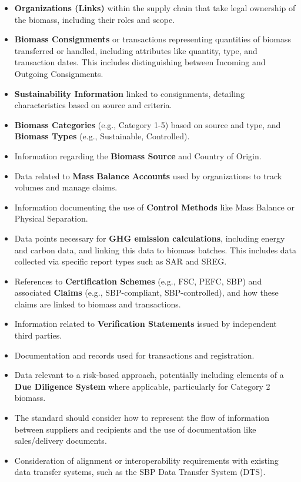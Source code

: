 \documentclass[title=small,preset=opensansnote,par=skip]{article}
\begin{document}
\begin{itemize}
\item \textbf{Organizations (Links)} within the supply chain that take legal ownership of the biomass, including their roles and scope.
\item \textbf{Biomass Consignments} or transactions representing quantities of   biomass transferred or handled, including attributes like quantity,   type, and transaction dates. This includes distinguishing between Incoming and Outgoing Consignments.
\item \textbf{Sustainability Information} linked to consignments, detailing   characteristics based on source and criteria.
\item \textbf{Biomass Categories} (e.g., Category 1-5) based on source and type,   and \textbf{Biomass Types} (e.g., Sustainable, Controlled).
\item Information regarding the \textbf{Biomass Source} and Country of Origin.
\item Data related to \textbf{Mass Balance Accounts} used by organizations to track volumes and manage claims.
\item Information documenting the use of \textbf{Control Methods} like Mass Balance or Physical Separation.
\item Data points necessary for \textbf{GHG emission calculations}, including energy and carbon data, and linking this data to biomass batches. This includes data collected via specific report types such as SAR and SREG.
\item References to \textbf{Certification Schemes} (e.g., FSC, PEFC, SBP) and   associated \textbf{Claims} (e.g., SBP-compliant, SBP-controlled), and how these claims are linked to biomass and transactions.
\item Information related to \textbf{Verification Statements} issued by   independent third parties.
\item Documentation and records used for transactions and registration.
\item Data relevant to a risk-based approach, potentially including elements of a \textbf{Due Diligence System} where applicable, particularly for Category 2 biomass.
\item The standard should consider how to represent the flow of information between suppliers and recipients and the use of documentation like   sales/delivery documents.
\item Consideration of alignment or interoperability requirements with   existing data transfer systems, such as the SBP Data Transfer System  (DTS).
\end{itemize}
\end{document}
